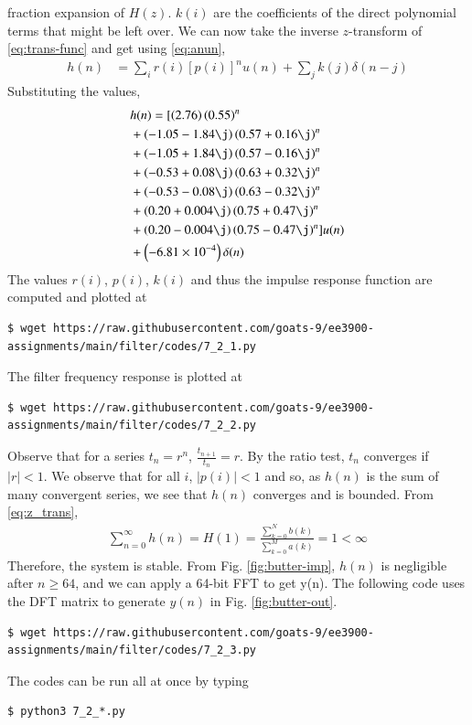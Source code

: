 \documentclass[journal,12pt,twocolumn]{IEEEtran}
\renewcommand\thesection{\arabic{section}}
\begin{document}
\begin{enumerate}[label=\thesection.\arabic*]
fraction expansion of $H(z)$. $k(i)$ are the coefficients of the direct polynomial 
terms that might be left over. We can now take the inverse $z$-transform of
\eqref{eq:trans-func} and get using \eqref{eq:anun},
\begin{align}
	h(n) &= \sum_{i}r(i)[p(i)]^nu(n) + \sum_{j}k(j)\delta(n - j)
	\label{eq:h-n-expr}
\end{align}
Substituting the values,
\begin{align}
	&h(n) = [\brak{2.76}\brak{0.55}^n \nonumber \\ 
	&+ \brak{-1.05-1.84\j}\brak{0.57+0.16\j}^n \nonumber \\
	&+ \brak{-1.05+1.84\j}\brak{0.57-0.16\j}^n \nonumber \\
	&+ \brak{-0.53+0.08\j}\brak{0.63+0.32\j}^n \nonumber \\
	&+ \brak{-0.53-0.08\j}\brak{0.63-0.32\j}^n \nonumber \\
	&+ \brak{0.20+0.004\j}\brak{0.75+0.47\j}^n \nonumber \\
	&+ \brak{0.20-0.004\j}\brak{0.75-0.47\j}^n]u(n) \nonumber \\
	&+ \brak{-6.81 \times 10^{-4}}\delta(n)
\end{align}
The values $r(i)$, $p(i)$, $k(i)$ and thus the impulse response function are computed and plotted at
\begin{lstlisting}
$ wget https://raw.githubusercontent.com/goats-9/ee3900-assignments/main/filter/codes/7_2_1.py
\end{lstlisting}
The filter frequency response is plotted at
\begin{lstlisting}
$ wget https://raw.githubusercontent.com/goats-9/ee3900-assignments/main/filter/codes/7_2_2.py
\end{lstlisting}
Observe that for a series $t_n = r^n$, $\frac{t_{n + 1}}{t_n} = r$.
By the ratio test, $t_n$ converges if $|r| < 1$. We observe that for all $i$, 
$|p(i)| < 1$ and so, as $h(n)$ is the sum of many convergent series,
we see that $h(n)$ converges and is bounded. From \eqref{eq:z_trans},
\begin{align}
	\sum_{n = 0}^{\infty}h(n) = H(1) = \frac{\sum_{k = 0}^{N}b(k)}{\sum_{k = 0}^{M}a(k)} = 1 < \infty
\end{align}
Therefore, the system is stable. From
Fig. \eqref{fig:butter-imp}, $h(n)$ is negligible after $n \geq 64$, and we
can apply a 64-bit FFT to get y(n). The following code uses the DFT matrix
to generate $y(n)$ in Fig. \eqref{fig:butter-out}.
\begin{lstlisting}
$ wget https://raw.githubusercontent.com/goats-9/ee3900-assignments/main/filter/codes/7_2_3.py
\end{lstlisting}
The codes can be run all at once by typing
\begin{lstlisting}
$ python3 7_2_*.py
\end{lstlisting}


\end{enumerate}
\end{document}

